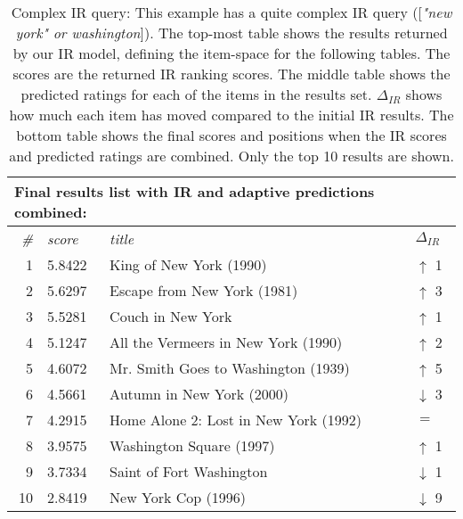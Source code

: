 \begin{table}[h]
  \vspace{1em} 

  \begin{tabular*}{0.9\textwidth}{ r l p{8.5cm} l }
    \multicolumn{4}{l}{Final results list with IR and adaptive predictions combined:}\\
    \toprule
    \emph{\#} & \emph{score} & \emph{title} & $\Delta_{IR}$ \\
    \midrule
    1 & 5.8422  &  King of New York (1990)                & \color{green} $\uparrow$ 1 \\
    2 & 5.6297  &  Escape from New York (1981)            & \color{green} $\uparrow$ 3 \\
    3 & 5.5281  &  Couch in New York                      & \color{green} $\uparrow$ 1 \\
    4 & 5.1247  &  All the Vermeers in New York (1990)    & \color{green} $\uparrow$ 2 \\
    5 & 4.6072  &  Mr. Smith Goes to Washington (1939)    & \color{green} $\uparrow$ 5 \\
    6 & 4.5661  &  Autumn in New York (2000)              & \color{red} $\downarrow$ 3 \\
    7 & 4.2915  &  Home Alone 2: Lost in New York (1992)  & \color{black} $=$ \\
    8 & 3.9575  &  Washington Square (1997)               & \color{green} $\uparrow$ 1 \\
    9 & 3.7334  &  Saint of Fort Washington               & \color{red} $\downarrow$ 1 \\
    10& 2.8419  &  New York Cop (1996)                    & \color{red} $\downarrow$ 9 \\
    \bottomrule
  \end{tabular*}

  \vspace{1em}
  \caption[Complex IR Query]{
    Complex IR query: This example has a quite complex IR query ([\emph{"new york" or washington}]).
    The top-most table shows the results returned by our IR model, defining the item-space for the following tables.
    The scores are the returned IR ranking scores.
    The middle table shows the predicted ratings for each of the items in the results set.
    $\Delta_{IR}$ shows how much each item has moved compared to the initial IR results.
    The bottom table shows the final scores and positions when the IR scores and predicted ratings are combined.
    Only the top 10 results are shown.
  }
  \label{table:rank:washington}
\end{table}

